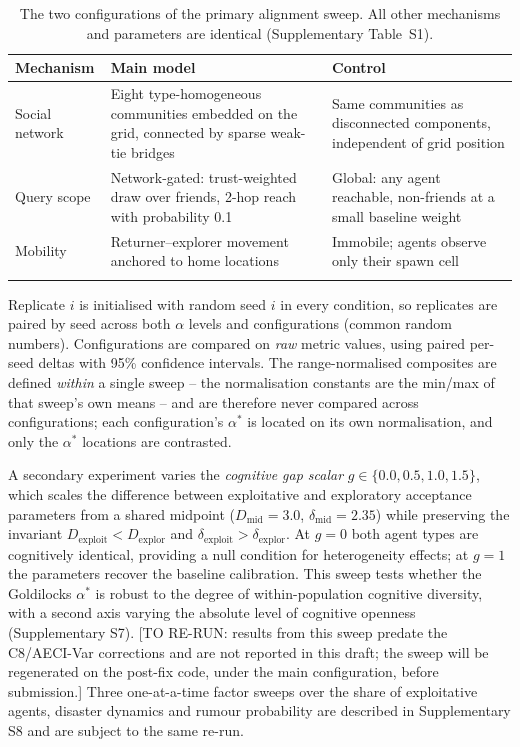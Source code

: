 \documentclass[sn-apacite]{sn-jnl}
\begin{document}
\begin{table}[h]
\caption{The two configurations of the primary alignment sweep. All other mechanisms and parameters are identical (Supplementary Table~S1).}\label{tab:configs}
\begin{tabular}{@{}p{3.2cm}p{4.6cm}p{4.6cm}@{}}
\toprule
Mechanism & Main model & Control \\
\midrule
Social network & Eight type-homogeneous communities embedded on the grid, connected by sparse weak-tie bridges & Same communities as disconnected components, independent of grid position \\
Query scope & Network-gated: trust-weighted draw over friends, 2-hop reach with probability 0.1 & Global: any agent reachable, non-friends at a small baseline weight \\
Mobility & Returner--explorer movement anchored to home locations \citep{pappalardo2015returners} & Immobile; agents observe only their spawn cell \\
\botrule
\end{tabular}
\end{table} Replicate $i$ is initialised with random seed $i$ in every condition, so replicates are paired by seed across both $\alpha$ levels and configurations (common random numbers). Configurations are compared on \emph{raw} metric values, using paired per-seed deltas with 95\% confidence intervals. The range-normalised composites are defined \emph{within} a single sweep -- the normalisation constants are the min/max of that sweep's own means -- and are therefore never compared across configurations; each configuration's $\alpha^{*}$ is located on its own normalisation, and only the $\alpha^{*}$ locations are contrasted.

A secondary experiment varies the \emph{cognitive gap scalar} $g \in \{0.0, 0.5, 1.0, 1.5\}$, which scales the difference between exploitative and exploratory acceptance parameters from a shared midpoint ($D_{\text{mid}} = 3.0$, $\delta_{\text{mid}} = 2.35$) while preserving the invariant $D_{\text{exploit}} < D_{\text{explor}}$ and $\delta_{\text{exploit}} > \delta_{\text{explor}}$. At $g = 0$ both agent types are cognitively identical, providing a null condition for heterogeneity effects; at $g = 1$ the parameters recover the baseline calibration. This sweep tests whether the Goldilocks $\alpha^{*}$ is robust to the degree of within-population cognitive diversity, with a second axis varying the absolute level of cognitive openness (Supplementary S7). [TO RE-RUN: results from this sweep predate the C8/AECI-Var corrections and are not reported in this draft; the sweep will be regenerated on the post-fix code, under the main configuration, before submission.] Three one-at-a-time factor sweeps over the share of exploitative agents, disaster dynamics and rumour probability are described in Supplementary S8 and are subject to the same re-run.
\end{document}
